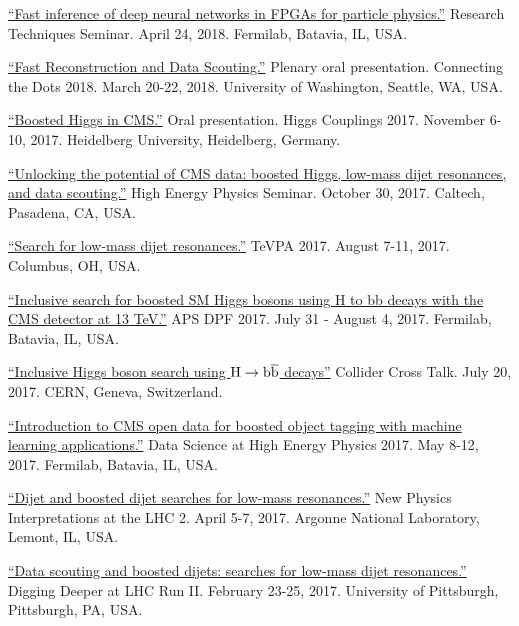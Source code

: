 \documentclass[11pt]{res}
\begin{document}
\begin{resume}
\href{https://indico.fnal.gov/event/16908/}{``Fast inference of deep neural networks in FPGAs for particle physics.''} Research Techniques Seminar. April 24, 2018. Fermilab, Batavia, IL, USA.

\href{https://indico.cern.ch/event/658267/contributions/2881127/}{``Fast Reconstruction and Data Scouting.''} Plenary oral
  presentation. Connecting the Dots 2018. March 20-22,
  2018. University of Washington, Seattle, WA, USA.

\href{http://www.thphys.uni-heidelberg.de/~higgs/talks/duarte.pdf}{``Boosted Higgs in CMS.''} Oral
  presentation. Higgs Couplings 2017. November 6-10, 2017. Heidelberg
  University, Heidelberg, Germany.

\href{https://indico.hep.caltech.edu/indico/conferenceDisplay.py?confId=149}{``Unlocking the potential of CMS data: boosted Higgs, low-mass dijet resonances, and data scouting.''} High Energy Physics Seminar. October 30, 2017. Caltech, Pasadena, CA, USA.

\href{https://indico.cern.ch/event/615891/contributions/2666361/}{``Search
    for low-mass dijet resonances.''} TeVPA 2017. August 7-11,
  2017. Columbus, OH, USA.

\href{https://indico.fnal.gov/contributionDisplay.py?sessionId=14&contribId=38&confId=11999}{``Inclusive
  search for boosted SM Higgs bosons using H to bb decays with the CMS
  detector at 13 TeV.''} APS DPF 2017.  July
  31 - August 4, 2017. Fermilab, Batavia, IL, USA.

\href{https://indico.cern.ch/event/649575/}{``Inclusive
    Higgs boson search using $\mathrm{H}\to\mathrm{b}\overline{\mathrm{b}}$ decays''} Collider Cross
  Talk. July 20, 2017. CERN, Geneva, Switzerland.

\href{https://indico.fnal.gov/contributionDisplay.py?sessionId=6&contribId=54&confId=13497}{``Introduction
    to CMS open data for boosted object tagging with machine learning
    applications.''} Data Science at High Energy Physics 2017. May
  8-12, 2017. Fermilab, Batavia, IL, USA.

\href{https://indico.cern.ch/event/540843/contributions/2464658/}{``Dijet
    and boosted dijet searches for low-mass resonances.''} New Physics Interpretations at the LHC 2. April
  5-7, 2017. Argonne National Laboratory, Lemont, IL, USA.

\href{https://indico.cern.ch/event/592671/contributions/2401900/}{``Data
    scouting and boosted dijets: searches for low-mass dijet
    resonances.''} Digging Deeper at LHC Run II. February
  23-25, 2017. University of Pittsburgh, Pittsburgh, PA, USA.


\end{resume}
\end{document}
